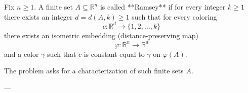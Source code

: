 Fix $n\ge 1$.
A finite set $A\subseteq\mathbb R^n$ is called **Ramsey** if for every integer $k\ge 1$ there exists an integer $d=d(A,k)\ge 1$ such that for every coloring
\[
c:\mathbb R^d\to\{1,2,\dots,k\}
\]
there exists an isometric embedding (distance-preserving map)
\[
\varphi:\mathbb R^n\to\mathbb R^d
\]
and a color $\gamma$ such that $c$ is constant equal to $\gamma$ on $\varphi(A)$.

The problem asks for a characterization of such finite sets $A$.

---
